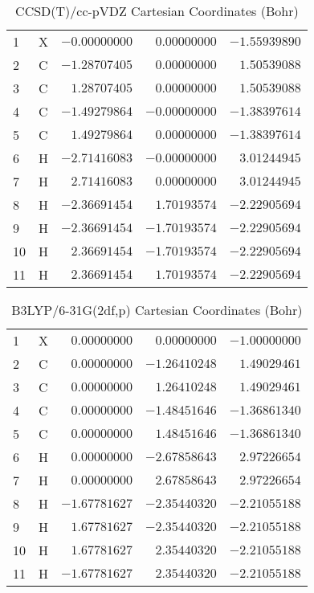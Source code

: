 \documentclass[10pt,oneside]{article}
\begin{document}
\begin{table}[h!]
\centering
\caption{CCSD(T)/cc-pVDZ Cartesian Coordinates (Bohr)}
\begin{tabular}{llrrr}
1  & X  & $-0.00000000$ & $ 0.00000000$ & $-1.55939890$ \\
2  & C  & $-1.28707405$ & $ 0.00000000$ & $ 1.50539088$ \\
3  & C  & $ 1.28707405$ & $ 0.00000000$ & $ 1.50539088$ \\
4  & C  & $-1.49279864$ & $-0.00000000$ & $-1.38397614$ \\
5  & C  & $ 1.49279864$ & $ 0.00000000$ & $-1.38397614$ \\
6  & H  & $-2.71416083$ & $-0.00000000$ & $ 3.01244945$ \\
7  & H  & $ 2.71416083$ & $ 0.00000000$ & $ 3.01244945$ \\
8  & H  & $-2.36691454$ & $ 1.70193574$ & $-2.22905694$ \\
9  & H  & $-2.36691454$ & $-1.70193574$ & $-2.22905694$ \\
10 & H  & $ 2.36691454$ & $-1.70193574$ & $-2.22905694$ \\
11 & H  & $ 2.36691454$ & $ 1.70193574$ & $-2.22905694$ \\
\end{tabular}
\end{table}

\begin{table}[h!]
\centering
\caption{B3LYP/6-31G(2df,p) Cartesian Coordinates (Bohr)}
\begin{tabular}{llrrr}
1  & X  & $ 0.00000000$ & $ 0.00000000$ & $-1.00000000$ \\
2  & C  & $ 0.00000000$ & $-1.26410248$ & $ 1.49029461$ \\
3  & C  & $ 0.00000000$ & $ 1.26410248$ & $ 1.49029461$ \\
4  & C  & $ 0.00000000$ & $-1.48451646$ & $-1.36861340$ \\
5  & C  & $ 0.00000000$ & $ 1.48451646$ & $-1.36861340$ \\
6  & H  & $ 0.00000000$ & $-2.67858643$ & $ 2.97226654$ \\
7  & H  & $ 0.00000000$ & $ 2.67858643$ & $ 2.97226654$ \\
8  & H  & $-1.67781627$ & $-2.35440320$ & $-2.21055188$ \\
9  & H  & $ 1.67781627$ & $-2.35440320$ & $-2.21055188$ \\
10 & H  & $ 1.67781627$ & $ 2.35440320$ & $-2.21055188$ \\
11 & H  & $-1.67781627$ & $ 2.35440320$ & $-2.21055188$ \\
\end{tabular}
\end{table}
\end{document}
